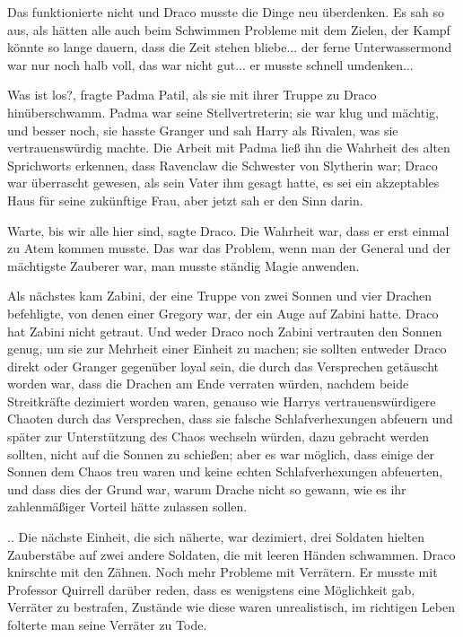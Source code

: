 Das funktionierte nicht und Draco musste die Dinge neu überdenken. Es sah so
aus, als hätten alle auch beim Schwimmen Probleme mit dem Zielen, der Kampf
könnte so lange dauern, dass die Zeit stehen bliebe... der ferne Unterwassermond
war nur noch halb voll, das war nicht gut... er musste schnell umdenken...

\glqq Was ist los?\grqq{}, fragte Padma Patil, als sie mit ihrer Truppe zu Draco
hinüberschwamm. Padma war seine Stellvertreterin; sie war klug und mächtig, und
besser noch, sie hasste Granger und sah Harry als Rivalen, was sie
vertrauenswürdig machte. Die Arbeit mit Padma ließ ihn die Wahrheit des alten
Sprichworts erkennen, dass Ravenclaw die Schwester von Slytherin war; Draco war
überrascht gewesen, als sein Vater ihm gesagt hatte, es sei ein akzeptables Haus
für seine zukünftige Frau, aber jetzt sah er den Sinn darin.

\glqq Warte, bis wir alle hier sind\grqq{}, sagte Draco. Die Wahrheit war, dass
er erst einmal zu Atem kommen musste. Das war das Problem, wenn man der General
und der mächtigste Zauberer war, man musste ständig Magie anwenden.

Als nächstes kam Zabini, der eine Truppe von zwei Sonnen und vier Drachen
befehligte, von denen einer Gregory war, der ein Auge auf Zabini hatte. Draco
hat Zabini nicht getraut. Und weder Draco noch Zabini vertrauten den Sonnen
genug, um sie zur Mehrheit einer Einheit zu machen; sie sollten entweder Draco
direkt oder Granger gegenüber loyal sein, die durch das Versprechen getäuscht
worden war, dass die Drachen am Ende verraten würden, nachdem beide Streitkräfte
dezimiert worden waren, genauso wie Harrys vertrauenswürdigere Chaoten durch das
Versprechen, dass sie falsche Schlafverhexungen abfeuern und später zur
Unterstützung des Chaos wechseln würden, dazu gebracht werden sollten, nicht auf
die Sonnen zu schießen; aber es war möglich, dass einige der Sonnen dem Chaos
treu waren und keine echten Schlafverhexungen abfeuerten, und dass dies der
Grund war, warum Drache nicht so gewann, wie es ihr zahlenmäßiger Vorteil hätte
zulassen sollen.

.. Die nächste Einheit, die sich näherte, war dezimiert, drei Soldaten hielten
Zauberstäbe auf zwei andere Soldaten, die mit leeren Händen schwammen. Draco
knirschte mit den Zähnen. Noch mehr Probleme mit Verrätern. Er musste mit
Professor Quirrell darüber reden, dass es wenigstens eine Möglichkeit gab,
Verräter zu bestrafen, Zustände wie diese waren unrealistisch, im richtigen
Leben folterte man seine Verräter zu Tode.

